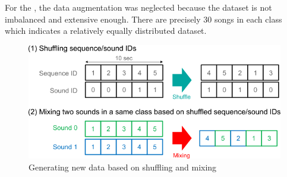 For the , the data augmentation was neglected because the dataset is not imbalanced and extensive enough. There are precisely 30 songs in each class which indicates a relatively equally distributed dataset.
\begin{figure}[htbp]
	\centering
	\includegraphics[scale=0.5]{baa-documentation/img/DCASE_data_augmentation.png}
	\caption[Generating new data based on shuffling and mixing]{Generating new data based on shuffling and mixing \footnotemark}
	\label{fig:DCASE-Data-Augmentation}
\end{figure}

